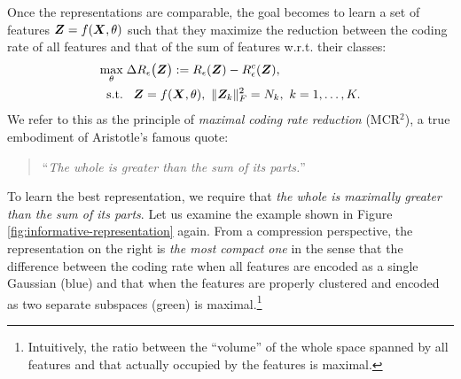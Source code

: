 \documentclass[../../book-main.tex]{subfiles}
\begin{document}
Once the representations are comparable, the goal becomes to learn a set of features $\bm{Z}  = f(\bm{X}, \theta)$  such that they maximize the reduction between the coding rate of all features and that of the sum of features w.r.t. their classes:
\begin{equation}
	\begin{aligned}
		\max_{\theta } & \;  \Delta R_{\epsilon}\big(\Z \big) := R_{\epsilon}(\Z) - R_{\epsilon}^c(\Z ), \\
		\mbox{s.t.} & \ \ \, \Z = f(\bm X, \theta),\  \|\Z_k\|_F^2                                          = N_k,\ k=1,\dots,K. 
	\end{aligned}
	\label{eqn:maximal-rate-reduction}
\end{equation}
We refer to this as the principle of {\em maximal coding rate reduction} (MCR$^2$),
a true embodiment of Aristotle's famous quote:
\begin{quote}
	\centering
	``{\em The whole is greater than the sum of its parts.}''
\end{quote}
To learn the best representation, we require that {\em the whole is maximally greater than the sum of its parts}. Let us examine the example shown in Figure \ref{fig:informative-representation} again. From a compression perspective, the representation on the right is {\em the most compact one} in the sense that the difference between the coding rate when all features are encoded as a single Gaussian (blue) and that when the features are properly clustered and encoded as two separate subspaces (green) is maximal.\footnote{Intuitively, the ratio between the ``volume'' of the whole space spanned by all features and that actually occupied by the features is maximal.}
\end{document}
